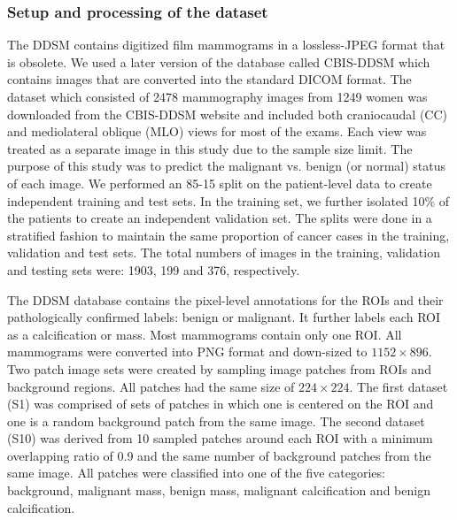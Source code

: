 \documentclass[12pt,letterpaper]{article}
\begin{document}
\subsubsection{Setup and processing of the dataset}
The DDSM \cite{heath_digital_2001} contains digitized film mammograms in a lossless-JPEG format that is obsolete. We used a later version of the database called CBIS-DDSM \cite{lee_curated_2016} which contains images that are converted into the standard DICOM format. The dataset which consisted of 2478 mammography images from 1249 women was downloaded from the CBIS-DDSM website and included both craniocaudal (CC) and mediolateral oblique (MLO) views for most of the exams. Each view was treated as a separate image in this study due to the sample size limit. The purpose of this study was to predict the malignant vs. benign (or normal) status of each image. We performed an 85-15 split on the patient-level data to create independent training and test sets. In the training set, we further isolated 10\% of the patients to create an independent validation set. The splits were done in a stratified fashion to maintain the same proportion of cancer cases in the training, validation and test sets. The total numbers of images in the training, validation and testing sets were: 1903, 199 and 376, respectively. 

The DDSM database contains the pixel-level annotations for the ROIs and their pathologically confirmed labels: benign or malignant. It further labels each ROI as a calcification or mass. Most mammograms contain only one ROI. All mammograms were converted into PNG format and down-sized to $1152 \times 896$. Two patch image sets were created by sampling image patches from ROIs and background regions. All patches had the same size of $224 \times 224$. The first dataset (S1) was comprised of sets of patches in which one is centered on the ROI and one is a random background patch from the same image. The second dataset (S10) was derived from 10 sampled patches around each ROI with a minimum overlapping ratio of 0.9 and the same number of background patches from the same image. All patches were classified into one of the five categories: background, malignant mass, benign mass, malignant calcification and benign calcification.
\end{document}
